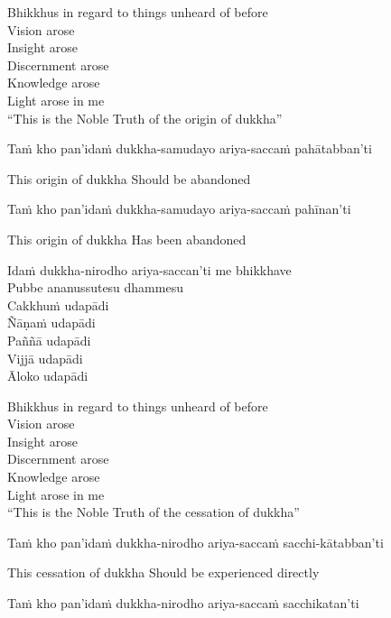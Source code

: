\begin{cprenglish}
  Bhikkhus in regard to things unheard of before\\
  Vision arose\\
  Insight arose\\
  Discernment arose\\
  Knowledge arose\\
  Light arose in me\\
  “This is the Noble Truth of the origin of dukkha”
\end{cprenglish}

Taṁ kho pan’idaṁ dukkha-samudayo ariya-saccaṁ pahātabban’ti

\begin{cprenglish}
  This origin of dukkha
  Should be abandoned
\end{cprenglish}

Taṁ kho pan’idaṁ dukkha-samudayo ariya-saccaṁ pahīnan’ti

\begin{cprenglish}
  This origin of dukkha
  Has been abandoned
\end{cprenglish}

Idaṁ dukkha-nirodho ariya-saccan’ti me bhikkhave\\
Pubbe ananussutesu dhammesu\\
Cakkhuṁ udapādi\\
Ñāṇaṁ udapādi\\
Paññā udapādi\\
Vijjā udapādi\\
Āloko udapādi

\begin{cprenglish}
  Bhikkhus in regard to things unheard of before\\
  Vision arose\\
  Insight arose\\
  Discernment arose\\
  Knowledge arose\\
  Light arose in me\\
  “This is the Noble Truth of the cessation of dukkha”
\end{cprenglish}

Taṁ kho pan’idaṁ dukkha-nirodho ariya-saccaṁ sacchi-kātabban’ti

\begin{cprenglish}
  This cessation of dukkha
  Should be experienced directly
\end{cprenglish}

Taṁ kho pan’idaṁ dukkha-nirodho ariya-saccaṁ sacchikatan’ti

